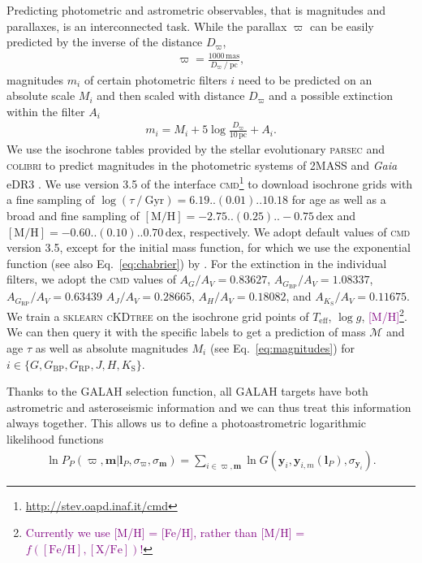 \documentclass[
  journal=pasa,
  manuscript=research-paper, %
  year=2021,
  volume=37,
]{cup-journal}
\newcommand{\SB}[1]{{\textcolor{purple}{#1}}}
\newcommand{\Teff}{$T_\mathrm{eff}$\xspace}
\newcommand{\logg}{$\log g$\xspace}
\newcommand{\Gaia}{\textit{Gaia}\xspace}
\begin{document}
Predicting photometric and astrometric observables, that is magnitudes and parallaxes, is an interconnected task. While the parallax $\varpi$ can be easily predicted by the inverse of the distance $D_\varpi$,
\begin{align}
    \varpi = \frac{1000\,\mathrm{mas}}{D_\varpi~/~\mathrm{pc}},
\end{align}
magnitudes $m_i$ of certain photometric filters $i$ need to be predicted on an absolute scale $M_i$ and then scaled with distance $D_\varpi$ and a possible extinction within the filter $A_i$
\begin{align} \label{eq:magnitudes}
    m_i = M_i + 5 \log\frac{D_\varpi}{10\,\mathrm{pc}} + A_i.
\end{align}
We use the isochrone tables provided by the stellar evolutionary \textsc{parsec} \citep[v. 1.2][]{Bressan2012, Tang2014, Chen2014, Chen2015} and \textsc{colibri} \citep[S\_37, S\_35 and PR16][]{Marigo2013, Rosenfield2016, Marigo2017, Pastorelli2019, Pastorelli2020} to predict magnitudes in the photometric systems of 2MASS \citep{Cohen2003} and \Gaia eDR3 \citep{Riello2021}. We use version 3.5 of the interface \textsc{cmd}\footnote{\url{http://stev.oapd.inaf.it/cmd}} to download isochrone grids with a fine sampling of $\log (\tau~/~\mathrm{Gyr}) = 6.19..(0.01)..10.18$ for age as well as a broad and fine sampling of $\mathrm{[M/H]} = -2.75..(0.25)..-0.75\,\mathrm{dex}$ and $\mathrm{[M/H]} = -0.60..(0.10)..0.70\,\mathrm{dex}$, respectively. We adopt default values of \textsc{cmd} version 3.5, except for the initial mass function, for which we use the exponential function (see also Eq.~\ref{eq:chabrier}) by \citet{Chabrier2001}. For the extinction in the individual filters, we adopt the \textsc{cmd} values of $A_{G}/A_V = 0.83627$,
$A_{G_\text{BP}}/A_V = 1.08337$,
$A_{G_\text{RP}}/A_V = 0.63439$
$A_{J}/A_V = 0.28665$,
$A_{H}/A_V = 0.18082$, and
$A_{K_\text{S}}/A_V = 0.11675$.
We train a \textsc{sklearn} \textsc{cKDtree} on the isochrone grid points of \Teff, \logg, \SB{[M/H]}\footnote{\SB{Currently we use [M/H] = [Fe/H], rather than [M/H] = $f(\mathrm{[Fe/H]},\mathrm{[X/Fe]})$!}}. We can then query it with the specific labels to get a prediction of mass $\mathcal{M}$ and age $\tau$ as well as absolute magnitudes $M_i$ (see Eq.~\ref{eq:magnitudes}) for $i \in \{G, G_\text{BP}, G_\text{RP}, J, H, K_\text{S}\}$.

Thanks to the GALAH selection function, all GALAH targets have both astrometric and asteroseismic information and we can thus treat this information always together. This allows us to define a photoastrometric logarithmic likelihood functions
\begin{align} \label{eq:likelihood_photoastrometric}
    \ln P_P (\varpi, {\boldsymbol{m}} \vert {\boldsymbol{l}_P}, \sigma_\varpi, \sigma_{\boldsymbol{m}} ) = 
    \sum_{i \in {\varpi,{\boldsymbol{m}}}}
    \ln G({\boldsymbol{y}_i}, {\boldsymbol{y}_{i,m}} (\boldsymbol{l}_P), \sigma_{\boldsymbol{y}_i}).
\end{align}
\end{document}
